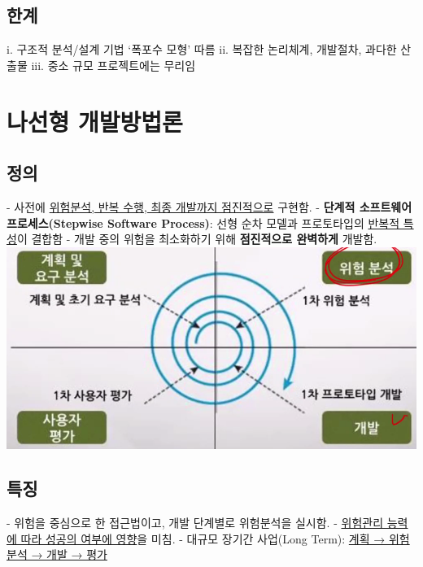 \documentclass[a4paper,12pt]{article}
\begin{document}
\subsection{한계}
i. 구조적 분석/설계 기법 ‘폭포수 모형’ 따름
\newline
ii. 복잡한 논리체계, 개발절차, 과다한 산출물
\newline
iii. 중소 규모 프로젝트에는 무리임

\newpage
\section{나선형 개발방법론}

\subsection{정의}
- 사전에 \underline{위험분석, 반복 수행, 최종 개발까지 점진적으로} 구현함.
\newline
- \textbf{단계적 소프트웨어 프로세스(Stepwise Software Process)}: 선형 순차 모델과 프로토타입의 \underline{반복적 특성}이 결합함
\newline
- 개발 중의 위험을 최소화하기 위해 \textbf{점진적으로 완벽하게} 개발함.
\newline
\newline
\includegraphics[scale=0.5]{31}
\newline

\subsection{특징}
- 위험을 중심으로 한 접근법이고, 개발 단계별로 위험분석을 실시함.
\newline
- \underline{위험관리 능력에 따라 성공의 여부에 영향}을 미침.
\newline
- 대규모 장기간 사업(Long Term): \underline{계획 → 위험분석 → 개발 → 평가}
\newline
\end{document}
